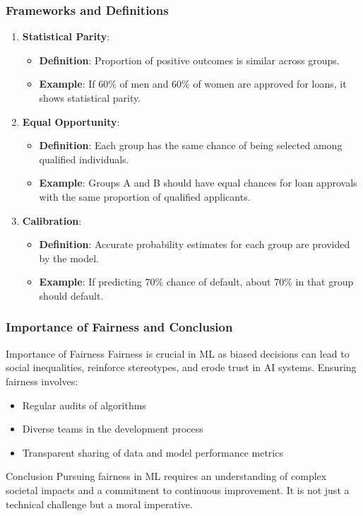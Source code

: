 \documentclass[aspectratio=169]{beamer}
\begin{document}
\begin{frame}[fragile]
    \frametitle{Frameworks and Definitions}
    \begin{enumerate}
        \item \textbf{Statistical Parity}:
            \begin{itemize}
                \item \textbf{Definition}: Proportion of positive outcomes is similar across groups.
                \item \textbf{Example}: If 60\% of men and 60\% of women are approved for loans, it shows statistical parity.
            \end{itemize}
        
        \item \textbf{Equal Opportunity}:
            \begin{itemize}
                \item \textbf{Definition}: Each group has the same chance of being selected among qualified individuals.
                \item \textbf{Example}: Groups A and B should have equal chances for loan approvals with the same proportion of qualified applicants.
            \end{itemize}
        
        \item \textbf{Calibration}:
            \begin{itemize}
                \item \textbf{Definition}: Accurate probability estimates for each group are provided by the model.
                \item \textbf{Example}: If predicting 70\% chance of default, about 70\% in that group should default.
            \end{itemize}
    \end{enumerate}
\end{frame}

\begin{frame}[fragile]
    \frametitle{Importance of Fairness and Conclusion}
    \begin{block}{Importance of Fairness}
        Fairness is crucial in ML as biased decisions can lead to social inequalities, reinforce stereotypes, and erode trust in AI systems. Ensuring fairness involves:
        \begin{itemize}
            \item Regular audits of algorithms
            \item Diverse teams in the development process
            \item Transparent sharing of data and model performance metrics
        \end{itemize}
    \end{block}

    \begin{block}{Conclusion}
        Pursuing fairness in ML requires an understanding of complex societal impacts and a commitment to continuous improvement. It is not just a technical challenge but a moral imperative.
    \end{block}
\end{frame}
\end{document}
